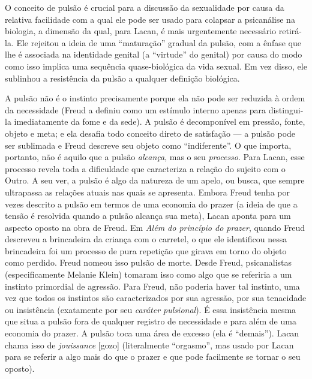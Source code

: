 O conceito de pulsão é crucial para a discussão da sexualidade por causa
da relativa facilidade com a qual ele pode ser usado para colapsar a
psicanálise na biologia, a dimensão da qual, para Lacan, é mais
urgentemente necessário retirá-la. Ele rejeitou a ideia de uma
``maturação'' gradual da pulsão, com a ênfase que lhe é associada na
identidade genital (a ``virtude'' do genital) por causa do modo como
isso implica uma sequência quase-biológica da vida sexual. Em vez disso,
ele sublinhou a resistência da pulsão a qualquer definição biológica.

A pulsão não é o instinto precisamente porque ela não pode ser reduzida
à ordem da necessidade (Freud a definiu como um estímulo interno apenas
para distingui-la imediatamente da fome e da sede). A pulsão é
decomponível em pressão, fonte, objeto e meta; e ela desafia todo
conceito direto de satisfação --- a pulsão pode ser sublimada e Freud
descreve seu objeto como ``indiferente''. O que importa, portanto, não é
aquilo que a pulsão \emph{alcança}, mas o seu \emph{processo}. Para
Lacan, esse processo revela toda a dificuldade que caracteriza a relação
do sujeito com o Outro. A seu ver, a pulsão é algo da natureza de um
apelo, ou busca, que sempre ultrapassa as relações atuais nas quais se
apresenta. Embora Freud tenha por vezes descrito a pulsão em termos de
uma economia do prazer (a ideia de que a tensão é resolvida quando a
pulsão alcança sua meta), Lacan aponta para um aspecto oposto na obra de
Freud. Em \emph{Além do princípio do prazer}, quando Freud descreveu a
brincadeira da criança com o carretel, o que ele identificou nessa
brincadeira foi um processo de pura repetição que girava em torno do
objeto como perdido. Freud nomeou isso pulsão de morte. Desde Freud,
psicanalistas (especificamente Melanie Klein) tomaram isso como algo que
se referiria a um instinto primordial de agressão. Para Freud, não
poderia haver tal instinto, uma vez que todos os instintos são
caracterizados por sua agressão, por sua tenacidade ou insistência
(exatamente por seu \emph{caráter pulsional}). É essa insistência mesma
que situa a pulsão fora de qualquer registro de necessidade e para além
de uma economia do prazer. A pulsão toca uma área de excesso (ela é
``demais''). Lacan chama isso de \emph{jouissance} {[}gozo{]}
(literalmente ``orgasmo'', mas usado por Lacan para se referir a algo
mais do que o prazer e que pode facilmente se tornar o seu oposto).


